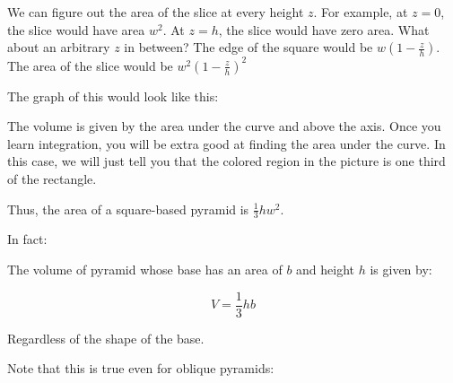 We can figure out the area of the slice at every height $z$.  For
example, at $z = 0$, the slice would have area $w^2$.  At $z = h$, the
slice would have zero area.  What about an arbitrary $z$ in between?
The edge of the square would be $w (1 - \frac{z}{h})$.  The area of
the slice would be $w^2 (1 - \frac{z}{h})^2$

The graph of this would look like this:


The volume is given by the area under the curve and above the
axis. Once you learn integration, you will be extra good at finding
the area under the curve.  In this case, we will just tell you that the colored region in the picture is one third of the rectangle.

Thus, the area of a square-based pyramid is $\frac{1}{3} h w^2$.

In fact:

\begin{mdframed}[style=important, frametitle={Volume of a pyramid}]

  The volume of pyramid whose base has an area of $b$ and height $h$ is given by:

  $$V = \frac{1}{3} h b$$

  Regardless of the shape of the base.
\end{mdframed}

Note that this is true even for oblique pyramids:

